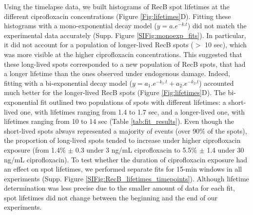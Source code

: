 Using the timelapse data, we built histograms of RecB spot lifetimes at the different ciprofloxacin concentrations (Figure \ref{Fig:lifetimes}D). Fitting these histograms with a mono-exponential decay model ($y = a.e^{-k.t}$) did not match the experimental data accurately (Supp. Figure \ref{SIFig:monoexp_fits}). In particular, it did not account for a population of longer-lived RecB spots ($>$ 10 sec), which was more visible at the higher ciprofloxacin concentrations. This suggested that these long-lived spots corresponded to a new population of RecB spots, that had a longer lifetime than the ones observed under endogenous damage. Indeed, fitting with a bi-exponential decay model ($y = a_1.e^{-k_1.t} + a_2.e^{-k_2.t}$) accounted much better for the longer-lived RecB spots (Figure \ref{Fig:lifetimes}D). The bi-exponential fit outlined two populations of spots with different lifetimes: a short-lived one, with lifetimes ranging from 1.4 to 1.7 sec, and a longer-lived one, with lifetimes ranging from 10 to 14 sec (Table \ref{tab:fit_results}). Even though the short-lived spots always represented a majority of events (over 90\% of the spots), the proportion of long-lived spots tended to increase under higher ciprofloxacin exposure (from 1.4\% $\pm$ 0.3 under 3 ng/mL ciprofloxacin to 5.5\% $\pm$ 1.4 under 30 ng/mL ciprofloxacin). To test whether the duration of ciprofloxacin exposure had an effect on spot lifetimes, we performed separate fits for 15-min windows in all experiments (Supp. Figure \ref{SIFig:RecB_lifetimes_timepoints}). Although lifetime determination was less precise due to the smaller amount of data for each fit, spot lifetimes did not change between the beginning and the end of our experiments.

